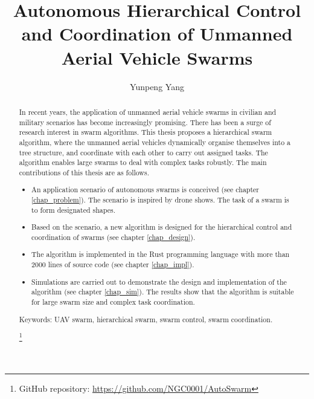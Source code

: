\documentclass[ieee]{uob-thesis}
\title{Autonomous Hierarchical Control and Coordination of Unmanned Aerial Vehicle Swarms}
\author{Yunpeng Yang}
\date{\printdatewithoutmonth{thesisdate}}
\newcommand\blfootnote[1]{%
\begingroup
\renewcommand\thefootnote{}\footnote{#1}%
\addtocounter{footnote}{-1}%
\endgroup
}
\begin{document}

\maketitle
\cleardoubleoddemptypage

\begin{abstract}
In recent years, the application of unmanned aerial vehicle swarms
in civilian and military scenarios has become increasingly promising.
There has been a surge of research interest in swarm algorithms.
This thesis proposes a hierarchical swarm algorithm,
where the unmanned aerial vehicles dynamically organise themselves into a tree structure,
and coordinate with each other to carry out assigned tasks.
The algorithm enables large swarms to deal with complex tasks robustly.
The main contributions of this thesis are as follows.
\begin{itemize}
\item An application scenario of autonomous swarms is conceived (see chapter \ref{chap_problem}).
      The scenario is inspired by drone shows. The task of a swarm is to form designated shapes.
\item Based on the scenario,
      a new algorithm is designed for the hierarchical control and coordination of swarms
      (see chapter \ref{chap_design}).
\item The algorithm is implemented in the Rust programming language
      with more than 2000 lines of source code (see chapter \ref{chap_impl}).
\item Simulations are carried out
      to demonstrate the design and implementation of the algorithm (see chapter \ref{chap_sim}).
      The results show that
      the algorithm is suitable for large swarm size and complex task coordination.
\end{itemize}

Keywords: UAV swarm, hierarchical swarm, swarm control, swarm coordination.

\blfootnote{GitHub repository: \url{https://github.com/NGC0001/AutoSwarm}}
\end{abstract}

\end{document}
